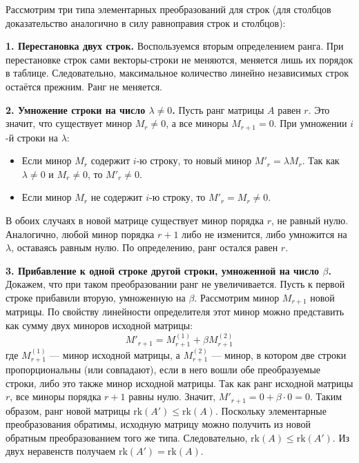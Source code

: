 \begin{tcolorbox}[title=Доказательство, breakable]
Рассмотрим три типа элементарных преобразований для строк (для столбцов доказательство аналогично в силу равноправия строк и столбцов):

\textbf{1. Перестановка двух строк.}
Воспользуемся вторым определением ранга. При перестановке строк сами векторы-строки не меняются, меняется лишь их порядок в таблице. Следовательно, максимальное количество линейно независимых строк остаётся прежним. Ранг не меняется.

\textbf{2. Умножение строки на число $\lambda \neq 0$.}
Пусть ранг матрицы $A$ равен $r$. Это значит, что существует минор $M_r \neq 0$, а все миноры $M_{r+1} = 0$. При умножении $i$-й строки на $\lambda$:
\begin{itemize}
    \item Если минор $M_r$ содержит $i$-ю строку, то новый минор $M'_r = \lambda M_r$. Так как $\lambda \neq 0$ и $M_r \neq 0$, то $M'_r \neq 0$.
    \item Если минор $M_r$ не содержит $i$-ю строку, то $M'_r = M_r \neq 0$.
\end{itemize}
В обоих случаях в новой матрице существует минор порядка $r$, не равный нулю. Аналогично, любой минор порядка $r+1$ либо не изменится, либо умножится на $\lambda$, оставаясь равным нулю. По определению, ранг остался равен $r$.

\textbf{3. Прибавление к одной строке другой строки, умноженной на число $\beta$.}
Докажем, что при таком преобразовании ранг не увеличивается. Пусть к первой строке прибавили вторую, умноженную на $\beta$. Рассмотрим минор $M_{r+1}$ новой матрицы. По свойству линейности определителя этот минор можно представить как сумму двух миноров исходной матрицы:
\[ M'_{r+1} = M_{r+1}^{(1)} + \beta M_{r+1}^{(2)} \]
где $M_{r+1}^{(1)}$ — минор исходной матрицы, а $M_{r+1}^{(2)}$ — минор, в котором две строки пропорциональны (или совпадают), если в него вошли обе преобразуемые строки, либо это также минор исходной матрицы. Так как ранг исходной матрицы $r$, все миноры порядка $r+1$ равны нулю. Значит, $M'_{r+1} = 0 + \beta \cdot 0 = 0$. 
Таким образом, ранг новой матрицы $\mathrm{rk}(A') \le \mathrm{rk}(A)$. Поскольку элементарные преобразования обратимы, исходную матрицу можно получить из новой обратным преобразованием того же типа. Следовательно, $\mathrm{rk}(A) \le \mathrm{rk}(A')$. Из двух неравенств получаем $\mathrm{rk}(A') = \mathrm{rk}(A)$.
\end{tcolorbox}

